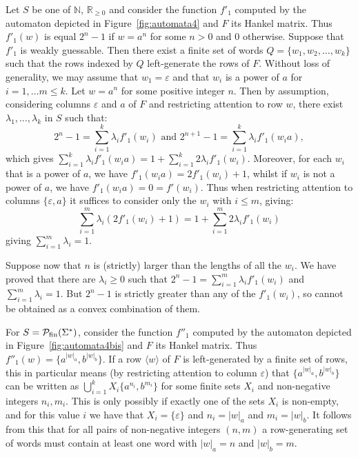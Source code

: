 \documentclass[10pt,a4paper]{amsart}
\theoremstyle{definition}
\numberwithin{equation}{section}
\numberwithin{theorem}{section}
\begin{document}
	Let $S$ be one of $\mathbb{N}$, $\mathbb{R}_{\geq 0}$ and consider the function $f'_1$ computed by the automaton depicted in Figure~\ref{fig:automata4} and $F$ its Hankel matrix. Thus $f'_1(w)$ is equal $2^n - 1$ if $w=a^n$ for some $n>0$ and $0$ otherwise. Suppose that $f'_1$ is weakly guessable. Then there exist a finite set of words $Q = \{w_1, w_2, \ldots, w_k\}$ such that the rows indexed by $Q$ left-generate the rows of $F$. Without loss of generality, we may assume that $w_1 = \varepsilon$ and that $w_i$ is a power of $a$ for $i=1, \ldots m \leq k$. Let $w = a^{n}$ for some positive integer $n$. Then by assumption, considering columns $\varepsilon$ and $a$ of $F$ and restricting attention to row $w$, there exist $\lambda_1, \ldots, \lambda_k$ in $S$ such that:
	\[2^{n} - 1 = \sum_{i=1}^k \lambda_i f'_1(w_i) \mbox{ and  }2^{n+1} - 1 = \sum_{i=1}^k \lambda_i f'_1(w_ia),\] which gives $\sum_{i=1}^k \lambda_i f'_1(w_ia) = 1+  \sum_{i=1}^k 2\lambda_i f'_1(w_i).$ Moreover, for each $w_i$ that is a power of $a$, we have $f'_1(w_ia) = 2f'_1(w_i) + 1$, whilst if $w_i$ is not a power of $a$, we have $f'_1(w_ia) = 0 = f'(w_i)$. Thus when restricting attention to columns $\{\varepsilon, a\}$ it suffices to consider only the $w_i$ with $i \leq m$, giving:
	\[\sum_{i=1}^m \lambda_i (2f'_1(w_i) + 1) = 1 + \sum_{i=1}^m 2\lambda_i f'_1(w_i)\]
	giving $\sum_{i=1}^m \lambda_i=1$.
	
	Suppose now that $n$ is (strictly) larger than the lengths of all the $w_i$. We have proved that there are $\lambda_i \geq 0$ such that $2^{n} - 1 = \sum_{i=1}^m \lambda_i f'_1(w_i)$ and $\sum_{i=1}^m \lambda_i=1$. But $2^n - 1$ is strictly greater than any of the $f'_1(w_i)$, so cannot be obtained as a convex combination of them. 
	
	For $S=\mathcal{P}_{\rm fin}(\Sigma^*)$, consider the function $f''_1$ computed by the automaton depicted in Figure~\ref{fig:automata4bis} and $F$ its Hankel matrix. Thus $f''_1(w) = \{a^{|w|_a},b^{|w|_b}\}$. If a row $\langle w \rangle$ of $F$  is left-generated by a finite set of rows, this in particular means (by restricting attention to column $\varepsilon$) that $\{a^{|w|_a}, b^{|w|_b}\}$ can be written as $\bigcup_{i=1}^k X_i\{a^{n_i}, b^{m_i}\}$ for some  finite sets $X_i$ and non-negative integers $n_i,m_i$. This is only possibly if exactly one of the sets $X_i$ is non-empty, and for this value $i$ we have that $X_i = \{\varepsilon\}$ and $n_i = |w|_a$ and  $m_i = |w|_b$. It follows from this that for all pairs of non-negative integers $(n,m)$ a row-generating set of words must contain at least one word with $|w|_a=n$ and $|w|_b=m$.
	\vspace{-1\baselineskip}
\end{document}
